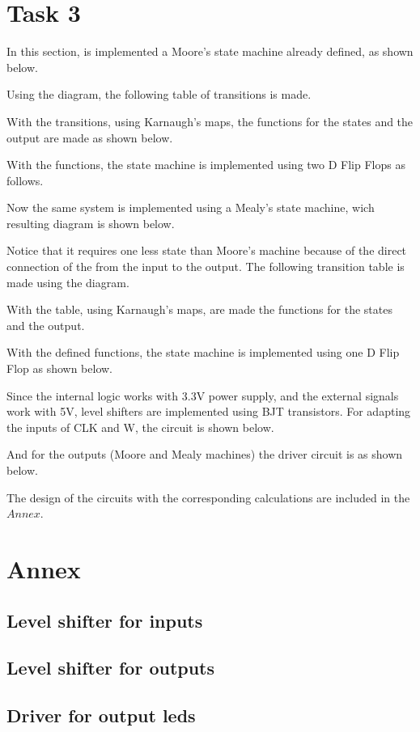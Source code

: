 


\section*{Task 3}

In this section, is implemented a Moore's state
machine already defined, as shown below.


Using the diagram, the following table of transitions 
is made.


With the transitions, using Karnaugh's maps, the 
functions for the states and the output are made
as shown below.


With the functions, the state machine is implemented 
using two D Flip Flops as follows. 


Now the same system is implemented using a Mealy's 
state machine, wich resulting diagram is shown below.


Notice that it requires one less state than Moore's
machine because of the direct connection of the 
from the input to the output. The following 
transition table is made using the diagram.


With the table, using Karnaugh's maps, are made 
the functions for the states and the output.


With the defined functions, the state machine is 
implemented using one D Flip Flop as shown below.


Since the internal logic works with 3.3V power supply, 
and the external signals work with 5V, level shifters 
are implemented using BJT transistors. For adapting
the inputs of CLK and W, the circuit is shown 
below. 


And for the outputs (Moore and Mealy machines) 
the driver circuit is as shown below.


The design of the circuits with the corresponding 
calculations are included in the $Annex$.

\newpage

\section*{Annex}
\subsection*{Level shifter for inputs}

\subsection*{Level shifter for outputs}

\subsection*{Driver for output leds}

